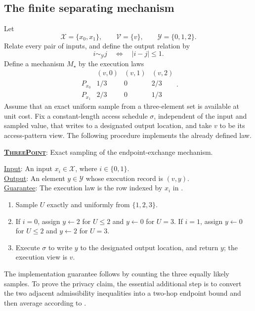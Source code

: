 \documentclass[11pt]{article}
\newenvironment{fminipage}%
  {\begin{Sbox}\begin{minipage}}%
  {\end{minipage}\end{Sbox}\fbox{\TheSbox}}
\newenvironment{algbox}[0]{%
\vskip 0.2in
\noindent
\begin{fminipage}{6.3in}
}{%
\end{fminipage}
\vskip 0.2in
}
\begin{document}
\subsection{The finite separating mechanism}

Let
\[
 \mathcal X=\{x_0,x_1\},\qquad
 \mathcal V=\{v\},\qquad
 \mathcal Y=\{0,1,2\}.
\]
Relate every pair of inputs, and define the output relation by
\[
 i\sim_{\mathcal Y}j
 \quad\Longleftrightarrow\quad
 |i-j|\leq1.
\]
Define a mechanism $M_\star$ by the execution laws
\begin{equation}
\begin{array}{c|ccc}
 & (v,0)&(v,1)&(v,2)\\ \hline
 P_{x_0}&1/3&0&2/3\\
 P_{x_1}&2/3&0&1/3
\end{array}.
\label{eq:three-point-law}
\end{equation}
Assume that an exact uniform sample from a three-element set is available at
unit cost.  Fix a constant-length access schedule $\sigma$, independent of the
input and sampled value, that writes to a designated output location, and take
$v$ to be its access-pattern view.  The following procedure implements the
already defined law.

\begin{algbox}
\label{alg:three-point}
\textbf{\uline{\textsc{ThreePoint}}}: Exact sampling of the endpoint-exchange mechanism.

\medskip
\noindent\uline{Input}: An input $x_i\in\mathcal X$, where $i\in\{0,1\}$.\\
\uline{Output}: An element $y\in\mathcal Y$ whose execution record is $(v,y)$.\\
\uline{Guarantee}: The execution law is the row indexed by $x_i$ in
.

\begin{enumerate}[leftmargin=*,itemsep=2pt,topsep=4pt]
  \item Sample $U$ exactly and uniformly from $\{1,2,3\}$.
  \item If $i=0$, assign $y\gets2$ for $U\leq2$ and $y\gets0$ for $U=3$.
        If $i=1$, assign $y\gets0$ for $U\leq2$ and $y\gets2$ for $U=3$.
  \item Execute $\sigma$ to write $y$ to the designated output location, and
        return $y$; the execution view is $v$.
\end{enumerate}
\end{algbox}

The implementation guarantee follows by counting the three equally likely
samples.  To prove the privacy claim, the essential additional step is to
convert the two adjacent admissibility inequalities into a two-hop endpoint
bound and then average according to .
\end{document}
